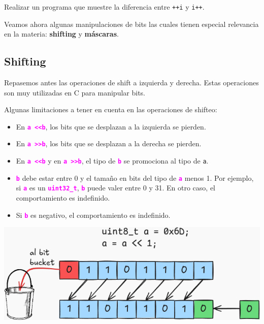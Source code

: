 \documentclass[]{scrartcl}
\newcommand{\hl}[1]{\textcolor{magenta}{\textbf{\texttt{#1}}}}
\begin{document}
\begin{exbox}[label=ejercicio5]
  Realizar un programa que muestre la diferencia entre \texttt{++i} y \texttt{i++}.
\end{exbox}

Veamos ahora algunas manipulaciones de bits las cuales tienen especial relevancia en la materia: \textbf{shifting} y \textbf{máscaras}.

\subsection*{Shifting}

Repasemos antes las operaciones de shift a izquierda y derecha. Estas operaciones son muy utilizadas en C para manipular bits.

Algunas limitaciones a tener en cuenta en las operaciones de shifteo:
\begin{itemize}
  \item En \hl{a \textless\textless \space b}, los bits que se desplazan a la izquierda se pierden.
  \item En \hl{a \textgreater\textgreater \space b}, los bits que se desplazan a la derecha se pierden.
  \item En \hl{a \textless\textless \space b} y en \hl{a \textgreater\textgreater \space b}, el tipo de \hl{b} se promociona al tipo de \texttt{a}.
  \item \hl{b} debe estar entre 0 y el tamaño en bits del tipo de \hl{a} menos 1. Por ejemplo, si \hl{a} es un \hl{uint32\_t}, \hl{b} puede valer entre 0 y 31. En otro caso, el comportamiento es indefinido.
  \item Si \hl{b} es negativo, el comportamiento es indefinido.
\end{itemize}

\begin{center}
  \includegraphics[scale=0.4]{./img/shift_left.png}  
  \label{fig:Shift_left}
\end{center}
\end{document}
